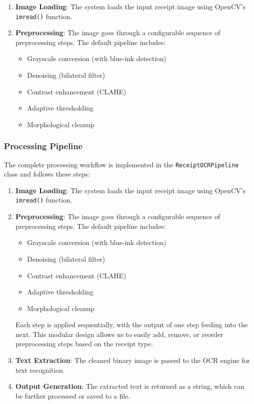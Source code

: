 \begin{enumerate}
    \item \textbf{Image Loading}: The system loads the input receipt image using OpenCV's \texttt{imread()} function.

    \item \textbf{Preprocessing}: The image goes through a configurable sequence of preprocessing steps. The default pipeline includes:
          \begin{itemize}
              \item Grayscale conversion (with blue-ink detection)
              \item Denoising (bilateral filter)
              \item Contrast enhancement (CLAHE)
              \item Adaptive thresholding
              \item Morphological cleanup
          \end{itemize}
\end{enumerate}

\subsubsection{Processing Pipeline}

The complete processing workflow is implemented in the \texttt{ReceiptOCRPipeline} class and follows these steps:

\begin{enumerate}
    \item \textbf{Image Loading}: The system loads the input receipt image using OpenCV's \texttt{imread()} function.

    \item \textbf{Preprocessing}: The image goes through a configurable sequence of preprocessing steps. The default pipeline includes:
          \begin{itemize}
              \item Grayscale conversion (with blue-ink detection)
              \item Denoising (bilateral filter)
              \item Contrast enhancement (CLAHE)
              \item Adaptive thresholding
              \item Morphological cleanup
          \end{itemize}

          Each step is applied sequentially, with the output of one step feeding into the next. This modular design allows us to easily add, remove, or reorder preprocessing steps based on the receipt type.

    \item \textbf{Text Extraction}: The cleaned binary image is passed to the OCR engine for text recognition.

    \item \textbf{Output Generation}: The extracted text is returned as a string, which can be further processed or saved to a file.
\end{enumerate}

